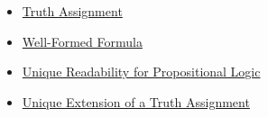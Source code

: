 \begin{dependencies}
\begin{itemize}
  \item \hyperref[def:truth-assignment-propositional-logic]{Truth Assignment}
  \item \hyperref[def:well-formed-formula]{Well-Formed Formula}
  \item \hyperref[thm:unique-readability-propositional-logic]{Unique Readability for Propositional Logic}
  \item \hyperref[thm:unique-extension-truth-assignment-propositional-logic]{Unique Extension of a Truth Assignment}
\end{itemize}
\end{dependencies}

\clearpage
